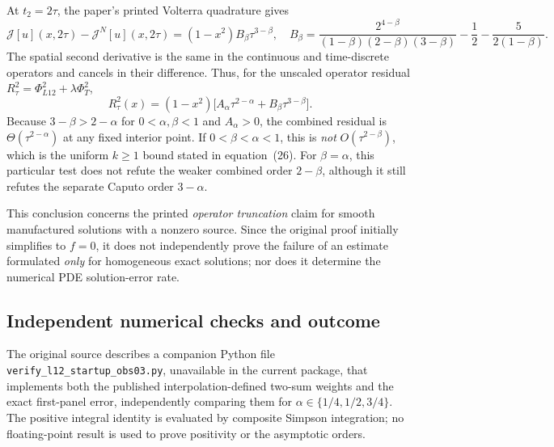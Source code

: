 \documentclass[11pt,a4paper]{amsart}
\theoremstyle{remark}
\theoremstyle{plain}
\theoremstyle{remark}
\numberwithin{equation}{section}
\begin{document}
At $t_2=2\tau$, the paper's printed Volterra quadrature gives
\begin{equation}\label{eq:ob03-volterra-n2}
 \mathcal J[u](x,2\tau)-\mathcal J^N[u](x,2\tau)
 =(1-x^2)B_\beta\tau^{3-\beta},\quad
 B_\beta=\frac{2^{4-\beta}}{(1-\beta)(2-\beta)(3-\beta)}
 -\frac12-\frac{5}{2(1-\beta)}.
\end{equation}
The spatial second derivative is the same in the continuous and time-discrete operators and cancels in their difference. Thus, for the unscaled operator residual $R_\tau^2=\Phi_{L12}^2+\lambda\Phi_T^2$,
\begin{equation}\label{eq:ob03-total-residual}
 R_\tau^2(x)=(1-x^2)\bigl[A_\alpha\tau^{2-\alpha}
 +B_\beta\tau^{3-\beta}\bigr].
\end{equation}
Because $3-\beta>2-\alpha$ for $0<\alpha,\beta<1$ and $A_\alpha>0$, the combined residual is $\Theta(\tau^{2-\alpha})$ at any fixed interior point. If $0<\beta<\alpha<1$, this is \emph{not} $O(\tau^{2-\beta})$, which is the uniform $k\ge1$ bound stated in equation~(26). For $\beta=\alpha$, this particular test does not refute the weaker combined order $2-\beta$, although it still refutes the separate Caputo order $3-\alpha$.

This conclusion concerns the printed \emph{operator truncation} claim for smooth manufactured solutions with a nonzero source. Since the original proof initially simplifies to $f=0$, it does not independently prove the failure of an estimate formulated \emph{only} for homogeneous exact solutions; nor does it determine the numerical PDE solution-error rate.

\subsection{Independent numerical checks and outcome}
The original source describes a companion Python file \texttt{verify\_l12\_startup\_obs03.py}, unavailable in the current package, that implements both the published interpolation-defined two-sum weights and the exact first-panel error, independently comparing them for $\alpha\in\{1/4,1/2,3/4\}$. The positive integral identity is evaluated by composite Simpson integration; no floating-point result is used to prove positivity or the asymptotic orders.
\end{document}
